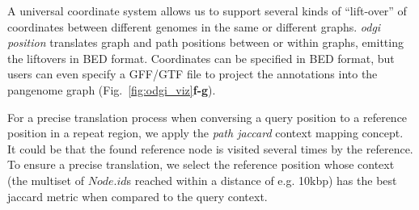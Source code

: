 \documentclass{bioinfo}
\begin{document}
A universal coordinate system allows us to support several kinds of ``lift-over'' of coordinates between different genomes in the same or different graphs.
\textit{odgi position} translates graph and path positions between or within graphs, emitting the liftovers in BED format.
Coordinates can be specified in BED format, but users can even specify a GFF/GTF file to project the annotations into the pangenome graph (Fig.~\ref{fig:odgi_viz}\textbf{f-g}).

For a precise translation process when conversing a query position to a reference position in a repeat region, we apply the \textit{path jaccard} context mapping concept.
It could be that the found reference node is visited several times by the reference.
To ensure a precise translation, we select the reference position whose context (the multiset of $Node.id$s reached within a distance of e.g. 10kbp) has the best jaccard metric when compared to the query context.

\end{document}

